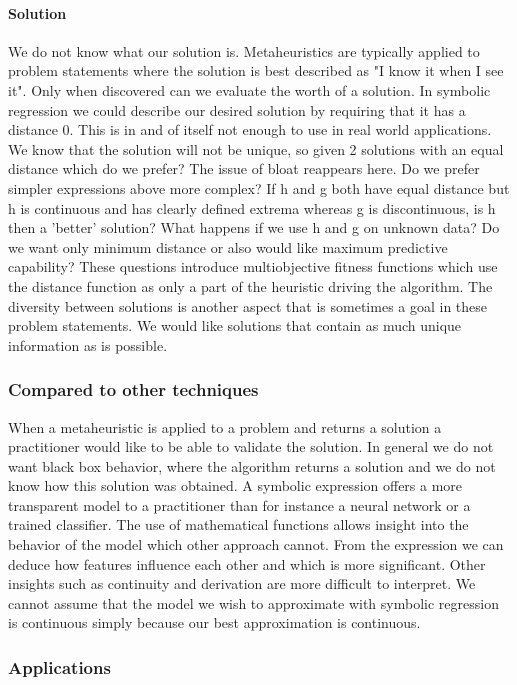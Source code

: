 \paragraph{Solution}
We do not know what our solution is. Metaheuristics are typically applied to problem statements where the solution is best described as "I know it when I see it". Only when discovered can we evaluate the worth of a solution. In symbolic regression we could describe our desired solution by requiring that it has a distance 0. This is in and of itself not enough to use in real world applications. We know that the solution will not be unique, so given 2 solutions with an equal distance which do we prefer? The issue of bloat reappears here. Do we prefer simpler expressions above more complex? If h and g both have equal distance but h is continuous and has clearly defined extrema whereas g is discontinuous, is h then a 'better' solution? What happens if we use h and g on unknown data? Do we want only minimum distance or also would like maximum predictive capability? These questions introduce multiobjective fitness functions which use the distance function as only a part of the heuristic driving the algorithm. The diversity between solutions is another aspect that is sometimes a goal in these problem statements. We would like solutions that contain as much unique information as is possible. 


\subsubsection{Compared to other techniques}
When a metaheuristic is applied to a problem and returns a solution a practitioner would like to be able to validate the solution. In general we do not want black box behavior, where the algorithm returns a solution and we do not know how this solution was obtained. A symbolic expression offers a more transparent model to a practitioner than for instance a neural network or a trained classifier. The use of mathematical functions allows insight into the behavior of the model which other approach cannot. From the expression we can deduce how features influence each other and which is more significant. Other insights such as continuity and derivation are more difficult to interpret. We cannot assume that the model we wish to approximate with symbolic regression is continuous simply because our best approximation is continuous.

\subsubsection{Applications}

